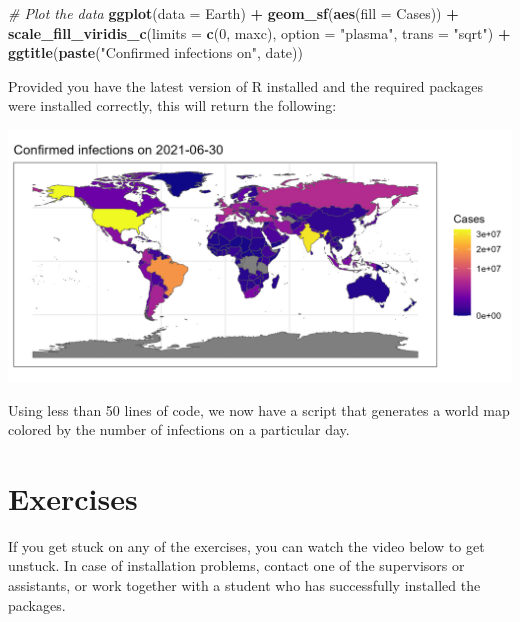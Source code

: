 \documentclass[
]{book}
\newenvironment{Shaded}{\begin{snugshade}}{\end{snugshade}}
\newcommand{\AttributeTok}[1]{\textcolor[rgb]{0.13,0.29,0.53}{#1}}
\newcommand{\CommentTok}[1]{\textcolor[rgb]{0.56,0.35,0.01}{\textit{#1}}}
\newcommand{\DecValTok}[1]{\textcolor[rgb]{0.00,0.00,0.81}{#1}}
\newcommand{\FunctionTok}[1]{\textcolor[rgb]{0.13,0.29,0.53}{\textbf{#1}}}
\newcommand{\NormalTok}[1]{#1}
\newcommand{\SpecialCharTok}[1]{\textcolor[rgb]{0.81,0.36,0.00}{\textbf{#1}}}
\newcommand{\StringTok}[1]{\textcolor[rgb]{0.31,0.60,0.02}{#1}}
\begin{document}
\begin{Shaded}
\begin{Highlighting}[]
\CommentTok{\# Plot the data}
\FunctionTok{ggplot}\NormalTok{(}\AttributeTok{data =}\NormalTok{ Earth) }\SpecialCharTok{+} \FunctionTok{geom\_sf}\NormalTok{(}\FunctionTok{aes}\NormalTok{(}\AttributeTok{fill =}\NormalTok{ Cases)) }\SpecialCharTok{+}
  \FunctionTok{scale\_fill\_viridis\_c}\NormalTok{(}\AttributeTok{limits =} \FunctionTok{c}\NormalTok{(}\DecValTok{0}\NormalTok{, maxc), }\AttributeTok{option =} \StringTok{"plasma"}\NormalTok{, }\AttributeTok{trans =} \StringTok{"sqrt"}\NormalTok{) }\SpecialCharTok{+}
  \FunctionTok{ggtitle}\NormalTok{(}\FunctionTok{paste}\NormalTok{(}\StringTok{"Confirmed infections on"}\NormalTok{, date))}
\end{Highlighting}
\end{Shaded}

Provided you have the latest version of R installed and the required packages were installed correctly, this will return the following:

\includegraphics[width=28in]{figures/COVIDEarth}

Using less than 50 lines of code, we now have a script that generates a world map colored by the number of infections on a particular day.

\hypertarget{exercises-1}{%
\section{Exercises}\label{exercises-1}}

If you get stuck on any of the exercises, you can watch the video below to get unstuck. In case of installation problems, contact one of the supervisors or assistants, or work together with a student who has successfully installed the packages.
\end{document}
